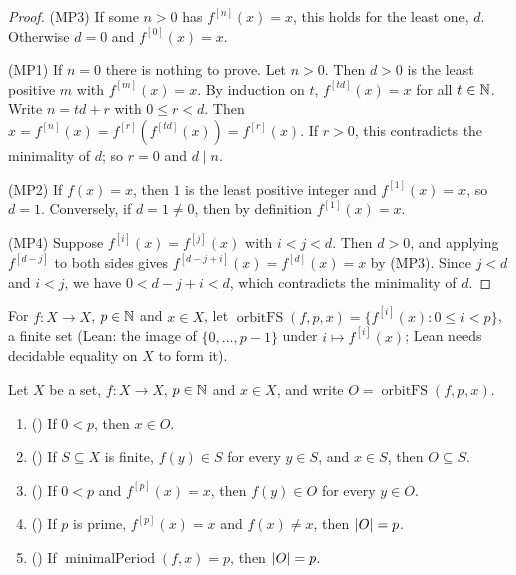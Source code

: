 \begin{proof}
(MP3) If some $n>0$ has $f^{[n]}(x)=x$, this holds for the least one, $d$. Otherwise $d=0$ and $f^{[0]}(x)=x$.

(MP1) If $n=0$ there is nothing to prove. Let $n>0$. Then $d>0$ is the least positive $m$ with $f^{[m]}(x)=x$. By
induction on $t$, $f^{[td]}(x)=x$ for all $t\in\mathbb N$. Write $n=td+r$ with $0\le r<d$. Then
$x=f^{[n]}(x)=f^{[r]}(f^{[td]}(x))=f^{[r]}(x)$. If $r>0$, this contradicts the minimality of $d$; so $r=0$ and $d\mid n$.

(MP2) If $f(x)=x$, then $1$ is the least positive integer and $f^{[1]}(x)=x$, so $d=1$. Conversely, if $d=1\ne0$, then by
definition $f^{[1]}(x)=x$.

(MP4) Suppose $f^{[i]}(x)=f^{[j]}(x)$ with $i<j<d$. Then $d>0$, and applying $f^{[d-j]}$ to both sides gives
$f^{[d-j+i]}(x)=f^{[d]}(x)=x$ by (MP3). Since $j<d$ and $i<j$, we have $0<d-j+i<d$, which contradicts the minimality
of $d$.
\end{proof}

\begin{definition}\label{sr:def:orbitFS}
For $f\colon X\to X$, $p\in\mathbb N$ and $x\in X$, let $\operatorname{orbitFS}(f,p,x)=\{f^{[i]}(x):0\le i<p\}$, a finite set
(Lean: the image of $\{0,\dots,p-1\}$ under $i\mapsto f^{[i]}(x)$; Lean needs decidable equality on $X$ to form it).
\end{definition}

\begin{lemma}\label{sr:lem:orbitFS}
Let $X$ be a set, $f\colon X\to X$, $p\in\mathbb N$ and $x\in X$, and write $O=\operatorname{orbitFS}(f,p,x)$.
\begin{enumerate}[label=(\alph*)]
\item () If $0<p$, then $x\in O$.
\item () If $S\subseteq X$ is finite, $f(y)\in S$ for every $y\in S$, and $x\in S$, then
  $O\subseteq S$.
\item () If $0<p$ and $f^{[p]}(x)=x$, then $f(y)\in O$ for every $y\in O$.
\item () If $p$ is prime, $f^{[p]}(x)=x$ and $f(x)\ne x$, then $\lvert O\rvert=p$.
\item () If $\operatorname{minimalPeriod}(f,x)=p$, then $\lvert O\rvert=p$.
\end{enumerate}
\end{lemma}

